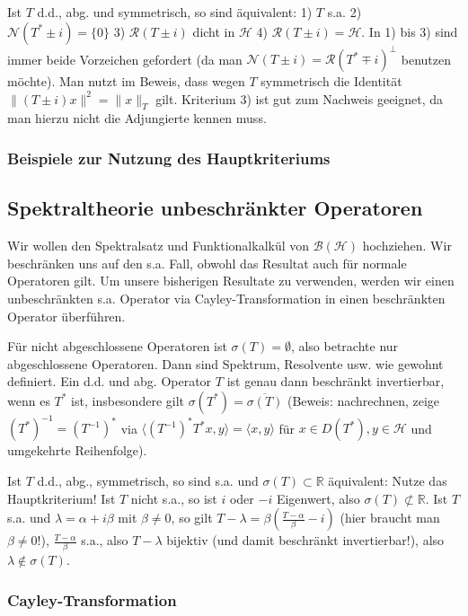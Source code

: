 \documentclass[11pt,a4paper]{scrartcl}
\newcommand{\R}{\mathbb{R}} %
\newcommand{\Hc}{\mathcal{H}}
\newcommand{\B}{\mathcal{B}}
\newcommand{\Nc}{\mathcal{N}}
\newcommand{\Rc}{\mathcal{R}}
\theoremstyle{plain}
\theoremstyle{definition}
\theoremstyle{remark}
\begin{document}
Ist $T$ d.d., abg. und symmetrisch, so sind äquivalent: 1) $T$ s.a. 2) $\Nc(T^*\pm i)=\{0\}$ 3) $\Rc(T\pm i)$ dicht in $\Hc$ 4) $\Rc(T\pm i)=\Hc$. In 1) bis 3) sind immer beide Vorzeichen gefordert (da man $\Nc(T\pm i)=\Rc(T^*\mp i)^\perp$ benutzen möchte). Man nutzt im Beweis, dass wegen $T$ symmetrisch die Identität $\|(T\pm i)x\|^2=\|x\|_T$ gilt. Kriterium 3) ist gut zum Nachweis geeignet, da man hierzu nicht die Adjungierte kennen muss.

\subsubsection{Beispiele zur Nutzung des Hauptkriteriums}


\subsection{Spektraltheorie unbeschränkter Operatoren}

Wir wollen den Spektralsatz und Funktionalkalkül von $\B(\Hc)$ hochziehen. Wir beschränken uns auf den s.a. Fall, obwohl das Resultat auch für normale Operatoren gilt. Um unsere bisherigen Resultate zu verwenden, werden wir einen unbeschränkten s.a. Operator via Cayley-Transformation in einen beschränkten Operator überführen.

Für nicht abgeschlossene Operatoren ist $\sigma(T)=\emptyset$, also betrachte nur abgeschlossene Operatoren. Dann sind Spektrum, Resolvente usw. wie gewohnt definiert. Ein d.d. und abg. Operator $T$ ist genau dann beschränkt invertierbar, wenn es $T^*$ ist, insbesondere gilt $\sigma(T^*)=\overline{\sigma(T)}$ (Beweis: nachrechnen, zeige $(T^*)^{-1}=(T^{-1})^*$ via $\langle (T^{-1})^*T^*x,y \rangle = \langle x, y \rangle$ für $x\in D(T^*), y\in \Hc$ und umgekehrte Reihenfolge).

Ist $T$ d.d., abg., symmetrisch, so sind s.a. und $\sigma(T)\subset \R$ äquivalent: Nutze das Hauptkriterium! Ist $T$ nicht s.a., so ist $i$ oder $-i$ Eigenwert, also $\sigma(T) \not\subset \R$. Ist $T$ s.a. und $\lambda=\alpha + i\beta$ mit $\beta\neq 0$, so gilt $T-\lambda = \beta(\frac{T-\alpha}{\beta}-i)$ (hier braucht man $\beta\neq 0$!), $\frac{T-\alpha}{\beta}$ s.a., also $T-\lambda$ bijektiv (und damit beschränkt invertierbar!), also $\lambda \not\in \sigma(T)$.

\subsubsection{Cayley-Transformation}
\end{document}
